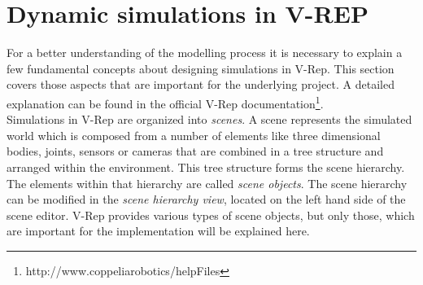 
\section{Dynamic simulations in V-REP}
For a better understanding of the modelling process it is necessary to explain a few fundamental concepts about designing simulations in V-Rep. This section covers those aspects that are important for the underlying project. A detailed explanation can be found in the official V-Rep documentation\footnote{http://www.coppeliarobotics/helpFiles}. \\

Simulations in V-Rep are organized into \emph{scenes}. A scene represents the simulated world which is composed from a number of elements like three dimensional bodies, joints, sensors or cameras that are combined in a tree structure and arranged within the environment. This tree structure forms the scene hierarchy. The elements within that hierarchy are called \emph{scene objects}. The scene hierarchy can be modified in the \emph{scene hierarchy view}, located on the left hand side of the scene editor. V-Rep provides various types of scene objects, but only those, which are important for the implementation will be explained here.

